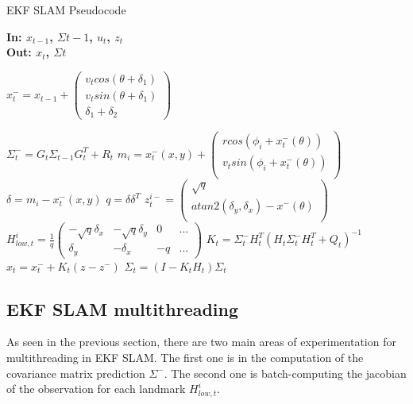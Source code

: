 \documentclass[conference]{IEEEtran}
\begin{document}
\begin{algorithm} 
\caption{EKF SLAM Pseudocode}\label{alg:ekf}
 \hspace*{\algorithmicindent} \textbf{In: $x_{t-1}$, $\Sigma{t-1}$, $u_t$, $z_t$} \\
 \hspace*{\algorithmicindent} \textbf{Out: $x_{t}$, $\Sigma{t}$} 
\begin{algorithmic}[1]
\State $x_t^- = x_{t-1} + \begin{pmatrix}
    v_t cos(\theta + \delta_1 ) \\
    v_t sin(\theta + \delta_1 ) \\
    \delta_1 + \delta_2 
    \end{pmatrix}$
    
\State $ \Sigma_{t}^{-} = G_t \Sigma_{t - 1} G_{t}^T + R_t$
    \State $m_i = x_t^-(x, y) +  \begin{pmatrix}
                                r cos(\phi_i + x_t^-(\theta)) \\
                                v_t sin(\phi_i + x_t^-(\theta)) \\
                                \end{pmatrix} $
\EndIf
\State $\delta = m_i - x_t^-(x, y)$
\State $q = \delta \delta^T$
\State $z_t^{i-} = \begin{pmatrix}
    \sqrt{q} \\
    atan2(\delta_y, \delta_x) - x^-(\theta) \\
    \end{pmatrix}$
\State $  H_{low, t}^i = \frac{1}{q} 
\begin{pmatrix}
-\sqrt{q} \delta_x & -\sqrt{q} \delta_y & 0 & ...\\
\delta_y & -\delta_x & -q & ... 
\end{pmatrix}$
\EndFor
\State $K_t = \Sigma_t^- H_t^T(H_t \Sigma_t^- H_t^T + Q_t)^{-1}$
\State $x_t = x_t^- + K_t(z - z^-)$
\State $\Sigma_t = (I - K_t H_t)\Sigma_t$
\end{algorithmic}
\end{algorithm}

\subsection{EKF SLAM multithreading}

As seen in the previous section, there are two main areas of experimentation for multithreading in EKF SLAM. The first one is in the computation of the covariance matrix prediction $\Sigma^-$. The second one is batch-computing the jacobian of the observation for each landmark $H_{low,t}^i$. 
\end{document}
